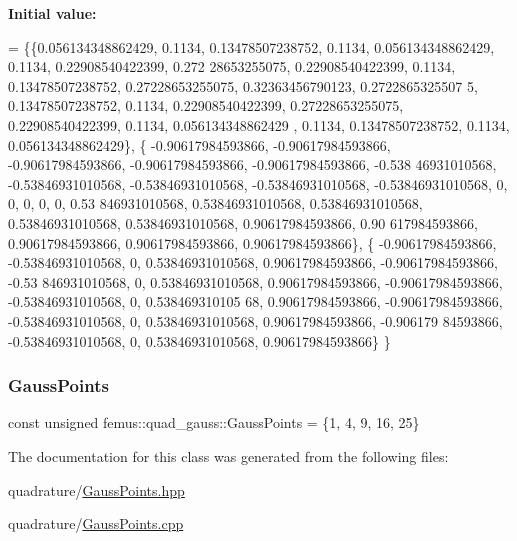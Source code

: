 {\bfseries Initial value\+:}
\begin{DoxyCode}
= \{\{0.056134348862429, 0.1134, 0.13478507238752, 0.1134, 0.056134348862429, 0.1134, 0.22908540422399, 0.272
      28653255075, 0.22908540422399, 0.1134, 0.13478507238752, 0.27228653255075, 0.32363456790123, 0.2722865325507
      5, 0.13478507238752, 0.1134, 0.22908540422399, 0.27228653255075, 0.22908540422399, 0.1134, 0.056134348862429
      , 0.1134, 0.13478507238752, 0.1134, 0.056134348862429\},
    \{ -0.90617984593866, -0.90617984593866, -0.90617984593866, -0.90617984593866, -0.90617984593866, -0.538
      46931010568, -0.53846931010568, -0.53846931010568, -0.53846931010568, -0.53846931010568, 0, 0, 0, 0, 0, 0.53
      846931010568, 0.53846931010568, 0.53846931010568, 0.53846931010568, 0.53846931010568, 0.90617984593866, 0.90
      617984593866, 0.90617984593866, 0.90617984593866, 0.90617984593866\},
    \{ -0.90617984593866, -0.53846931010568, 0, 0.53846931010568, 0.90617984593866, -0.90617984593866, -0.53
      846931010568, 0, 0.53846931010568, 0.90617984593866, -0.90617984593866, -0.53846931010568, 0, 0.538469310105
      68, 0.90617984593866, -0.90617984593866, -0.53846931010568, 0, 0.53846931010568, 0.90617984593866, -0.906179
      84593866, -0.53846931010568, 0, 0.53846931010568, 0.90617984593866\}
  \}
\end{DoxyCode}
\mbox{\label{classfemus_1_1quad__gauss_a8341b078548ce5e69a6f13e0878f9f06}} 
\subsubsection{\texorpdfstring{Gauss\+Points}{GaussPoints}}
{\footnotesize\ttfamily const unsigned femus\+::quad\+\_\+gauss\+::\+Gauss\+Points = \{1, 4, 9, 16, 25\}\hspace{0.3cm}{\ttfamily [static]}}



The documentation for this class was generated from the following files\+:\begin{DoxyCompactItemize}
\item 
quadrature/\mbox{\hyperlink{_gauss_points_8hpp}{Gauss\+Points.\+hpp}}\item 
quadrature/\mbox{\hyperlink{_gauss_points_8cpp}{Gauss\+Points.\+cpp}}\end{DoxyCompactItemize}
